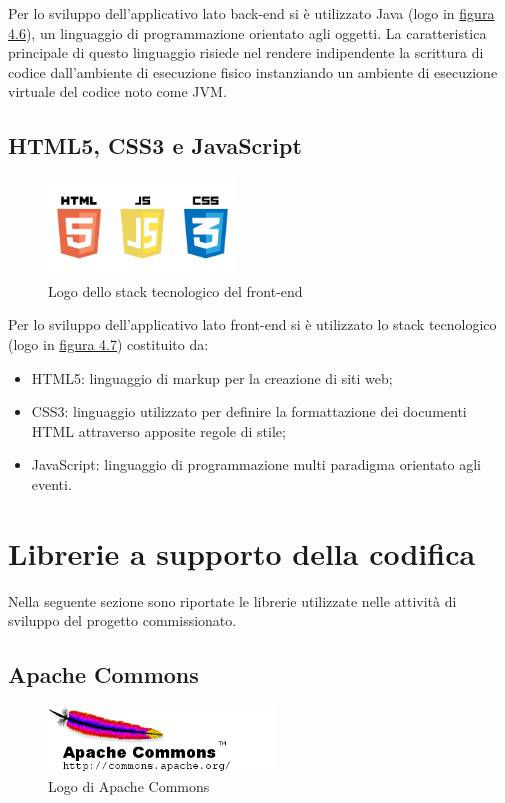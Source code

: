 \noindent Per lo sviluppo dell'applicativo lato back-end si è utilizzato Java (logo in {\hyperref[fig:java]{figura 4.6}}), un linguaggio di programmazione orientato agli oggetti. La caratteristica principale di questo linguaggio risiede nel rendere indipendente la scrittura di codice dall'ambiente di esecuzione fisico instanziando un ambiente di esecuzione virtuale del codice noto come JVM.

\subsection{HTML5, CSS3 e JavaScript}

\begin{figure}[!h]
	\centering
	\includegraphics[width=5cm]{../images/HTML5-logo.png}
	\caption{Logo dello stack tecnologico del front-end}
	\label{fig:frontend}
\end{figure}

\noindent Per lo sviluppo dell'applicativo lato front-end si è utilizzato lo stack tecnologico (logo in {\hyperref[fig:frontend]{figura 4.7}}) costituito da:
\begin{itemize}
\item HTML5: linguaggio di markup per la creazione di siti web;
\item CSS3: linguaggio utilizzato per definire la formattazione dei documenti HTML attraverso apposite regole di stile;
\item JavaScript: linguaggio di programmazione multi paradigma orientato agli eventi.
\end{itemize}

\section{Librerie a supporto della codifica}
Nella seguente sezione sono riportate le librerie utilizzate nelle attività di sviluppo del progetto commissionato. 

\subsection{Apache Commons}

\begin{figure}[!h]
	\centering
	\includegraphics[width=6cm]{../images/Commons-logo.png}
	\caption{Logo di Apache Commons}
	\label{fig:commons}
\end{figure}

